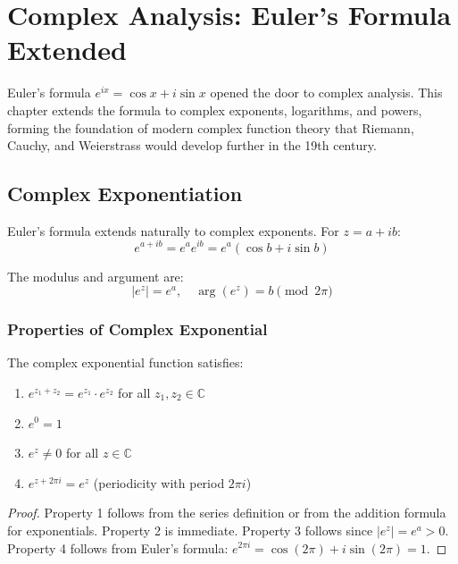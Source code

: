 
\chapter{Complex Analysis: Euler's Formula Extended}

\begin{historical}
Euler's formula $e^{ix} = \cos x + i \sin x$ opened the door to complex analysis.
This chapter extends the formula to complex exponents, logarithms, and powers,
forming the foundation of modern complex function theory that Riemann, Cauchy, and
Weierstrass would develop further in the 19th century.
\end{historical}

\section{Complex Exponentiation}

Euler's formula extends naturally to complex exponents. For $z = a + ib$:
\[
e^{a+ib} = e^a e^{ib} = e^a (\cos b + i \sin b)
\]

The modulus and argument are:
\[
|e^z| = e^a, \quad \arg(e^z) = b \pmod{2\pi}
\]

\subsection{Properties of Complex Exponential}

\begin{theorem}
The complex exponential function satisfies:
\begin{enumerate}
\item $e^{z_1 + z_2} = e^{z_1} \cdot e^{z_2}$ for all $z_1, z_2 \in \mathbb{C}$
\item $e^0 = 1$
\item $e^z \neq 0$ for all $z \in \mathbb{C}$
\item $e^{z + 2\pi i} = e^z$ (periodicity with period $2\pi i$)
\end{enumerate}
\end{theorem}

\begin{proof}
Property 1 follows from the series definition or from the addition formula for exponentials.
Property 2 is immediate. Property 3 follows since $|e^z| = e^a > 0$.
Property 4 follows from Euler's formula: $e^{2\pi i} = \cos(2\pi) + i\sin(2\pi) = 1$.
\end{proof}

